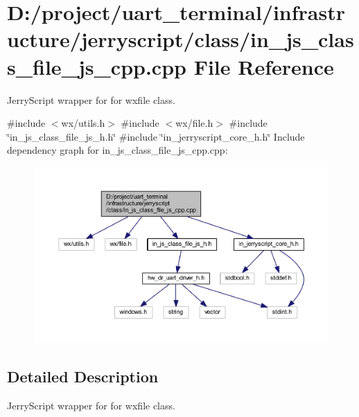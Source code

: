 \section{D\+:/project/uart\+\_\+terminal/infrastructure/jerryscript/class/in\+\_\+js\+\_\+class\+\_\+file\+\_\+js\+\_\+cpp.cpp File Reference}
\label{in__js__class__file__js__cpp_8cpp}


Jerry\+Script wrapper for for wxfile class.  


{\ttfamily \#include $<$wx/utils.\+h$>$}\newline
{\ttfamily \#include $<$wx/file.\+h$>$}\newline
{\ttfamily \#include \char`\"{}in\+\_\+js\+\_\+class\+\_\+file\+\_\+js\+\_\+h.\+h\char`\"{}}\newline
{\ttfamily \#include \char`\"{}in\+\_\+jerryscript\+\_\+core\+\_\+h.\+h\char`\"{}}\newline
Include dependency graph for in\+\_\+js\+\_\+class\+\_\+file\+\_\+js\+\_\+cpp.\+cpp\+:
\nopagebreak
\begin{figure}[H]
\begin{center}
\leavevmode
\includegraphics[width=350pt]{in__js__class__file__js__cpp_8cpp__incl}
\end{center}
\end{figure}


\subsection{Detailed Description}
Jerry\+Script wrapper for for wxfile class. 

